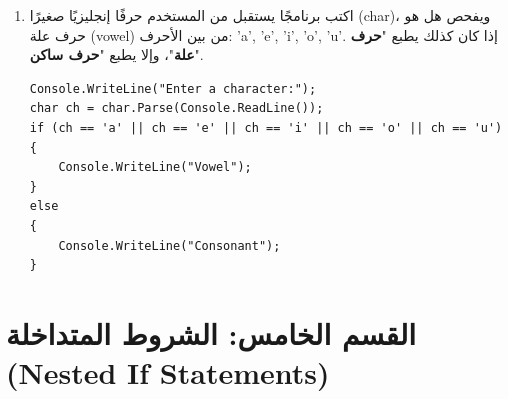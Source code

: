 \documentclass[14pt]{extarticle}
\begin{document}
\begin{enumerate}[resume, itemsep=2em]
\filbreak
\item
اكتب برنامجًا يستقبل من المستخدم حرفًا إنجليزيًا صغيرًا (\textenglish{char})، ويفحص هل هو حرف علة (\textenglish{vowel}) من بين الأحرف: \textenglish{'a', 'e', 'i', 'o', 'u'}. إذا كان كذلك يطبع "\textbf{حرف علة}"، وإلا يطبع "\textbf{حرف ساكن}".
\ifwithsols
\begin{boxSolution}
\begin{english}
\begin{verbatim}
Console.WriteLine("Enter a character:");
char ch = char.Parse(Console.ReadLine());
if (ch == 'a' || ch == 'e' || ch == 'i' || ch == 'o' || ch == 'u')
{
    Console.WriteLine("Vowel");
}
else
{
    Console.WriteLine("Consonant");
}
\end{verbatim}
\end{english}
\end{boxSolution}
\fi

\end{enumerate}

\clearpage
\section*{القسم الخامس: الشروط المتداخلة (\textenglish{Nested If Statements})}
\end{document}
